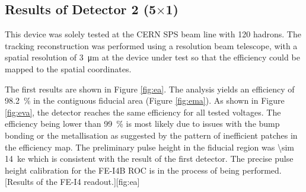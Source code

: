 \subsection{Results of Detector 2 (5$\times$1)}
This device was solely tested at the CERN SPS beam line with \SI{120}{\gev} hadrons. The tracking reconstruction was performed using a resolution beam telescope, with a spatial resolution of \SI{3}{\micro\meter} at the device under test so that the efficiency could be mapped to the spatial coordinates. \par
The first results are shown in Figure \ref{fig:ea}. The analysis yields an efficiency of \SI{98.2}{\%} in the contiguous fiducial area (Figure \ref{fig:ema}). As shown in Figure \ref{fig:eva}, the detector reaches the same efficiency for all tested voltages. The efficiency being lower than \SI{99}{\%} is most likely due to issues with the bump bonding or the metallisation as suggested by the pattern of inefficient patches in the efficiency map. The preliminary pulse height in the fiducial region was \SI{\sim 14}{\kilo e} which is consistent with the result of the first detector. The precise pulse height calibration for the FE-I4B \ac{ROC} is in the process of being performed.
[Results of the FE-I4 readout.][fig:ea]